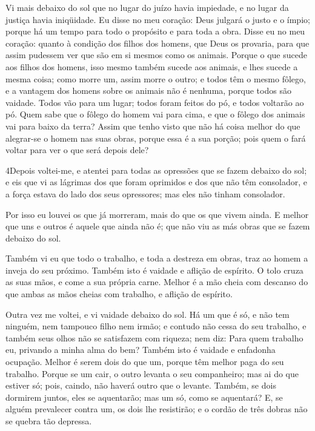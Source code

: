 Vi mais debaixo do sol que no lugar do juízo havia impiedade, e
no lugar da justiça havia iniqüidade. Eu disse no meu
coração: Deus julgará o justo e o ímpio; porque há um tempo para
todo o propósito e para toda a obra. Disse eu no meu coração:
quanto à condição dos filhos dos homens, que Deus os provaria, para
que assim pudessem ver que são em si mesmos como os animais.
Porque o que sucede aos filhos dos homens, isso mesmo também
sucede aos animais, e lhes sucede a mesma coisa; como morre um,
assim morre o outro; e todos têm o mesmo fôlego, e a vantagem dos
homens sobre os animais não é nenhuma, porque todos são vaidade.
Todos vão para um lugar; todos foram feitos do pó, e todos
voltarão ao pó. Quem sabe que o fôlego do homem vai para
cima, e que o fôlego dos animais vai para baixo da terra?
Assim que tenho visto que não há coisa melhor do que
alegrar-se o homem nas suas obras, porque essa é a sua porção; pois
quem o fará voltar para ver o que será depois dele?

\medskip

\lettrine{4} Depois voltei-me, e atentei para todas as
opressões que se fazem debaixo do sol; e eis que vi as lágrimas dos
que foram oprimidos e dos que não têm consolador, e a força estava
do lado dos seus opressores; mas eles não tinham consolador.

Por isso eu louvei os que já morreram, mais do que os que vivem
ainda. E melhor que uns e outros é aquele que ainda não é; que
não viu as más obras que se fazem debaixo do sol.

Também vi eu que todo o trabalho, e toda a destreza em obras, traz
ao homem a inveja do seu próximo. Também isto é vaidade e aflição de
espírito. O tolo cruza as suas mãos, e come a sua própria carne.
Melhor é a mão cheia com descanso do que ambas as mãos cheias
com trabalho, e aflição de espírito.

Outra vez me voltei, e vi vaidade debaixo do sol. Há um que é
só, e não tem ninguém, nem tampouco filho nem irmão; e contudo não
cessa do seu trabalho, e também seus olhos não se satisfazem com
riqueza; nem diz: Para quem trabalho eu, privando a minha alma do
bem? Também isto é vaidade e enfadonha ocupação. Melhor é serem
dois do que um, porque têm melhor paga do seu trabalho.
Porque se um cair, o outro levanta o seu companheiro; mas ai
do que estiver só; pois, caindo, não haverá outro que o levante.
Também, se dois dormirem juntos, eles se aquentarão; mas um
só, como se aquentará? E, se alguém prevalecer contra um, os
dois lhe resistirão; e o cordão de três dobras não se quebra tão
depressa.

